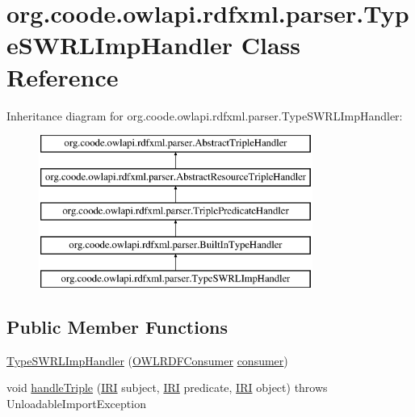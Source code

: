 \hypertarget{classorg_1_1coode_1_1owlapi_1_1rdfxml_1_1parser_1_1_type_s_w_r_l_imp_handler}{\section{org.\-coode.\-owlapi.\-rdfxml.\-parser.\-Type\-S\-W\-R\-L\-Imp\-Handler Class Reference}
\label{classorg_1_1coode_1_1owlapi_1_1rdfxml_1_1parser_1_1_type_s_w_r_l_imp_handler}
}
Inheritance diagram for org.\-coode.\-owlapi.\-rdfxml.\-parser.\-Type\-S\-W\-R\-L\-Imp\-Handler\-:\begin{figure}[H]
\begin{center}
\leavevmode
\includegraphics[height=5.000000cm]{classorg_1_1coode_1_1owlapi_1_1rdfxml_1_1parser_1_1_type_s_w_r_l_imp_handler}
\end{center}
\end{figure}
\subsection*{Public Member Functions}
\begin{DoxyCompactItemize}
\item 
\hyperlink{classorg_1_1coode_1_1owlapi_1_1rdfxml_1_1parser_1_1_type_s_w_r_l_imp_handler_ad54a85197af795fd2d28ed1cf197d507}{Type\-S\-W\-R\-L\-Imp\-Handler} (\hyperlink{classorg_1_1coode_1_1owlapi_1_1rdfxml_1_1parser_1_1_o_w_l_r_d_f_consumer}{O\-W\-L\-R\-D\-F\-Consumer} \hyperlink{classorg_1_1coode_1_1owlapi_1_1rdfxml_1_1parser_1_1_abstract_triple_handler_a4ccf4d898ff01eb1cadfa04b23d54e9c}{consumer})
\item 
void \hyperlink{classorg_1_1coode_1_1owlapi_1_1rdfxml_1_1parser_1_1_type_s_w_r_l_imp_handler_ae8b2aafab25b96bacf32b6dd48eeb151}{handle\-Triple} (\hyperlink{classorg_1_1semanticweb_1_1owlapi_1_1model_1_1_i_r_i}{I\-R\-I} subject, \hyperlink{classorg_1_1semanticweb_1_1owlapi_1_1model_1_1_i_r_i}{I\-R\-I} predicate, \hyperlink{classorg_1_1semanticweb_1_1owlapi_1_1model_1_1_i_r_i}{I\-R\-I} object)  throws Unloadable\-Import\-Exception 
\end{DoxyCompactItemize}
